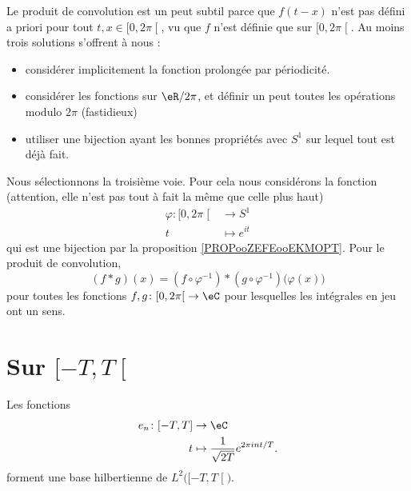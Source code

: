 Le produit de convolution est un peut subtil parce que \( f(t-x)\) n'est pas défini a priori pour tout \( t,x\in \mathopen[ 0 , 2\pi \mathclose[\), vu que \( f\) n'est définie que sur \( \mathopen[ 0 , 2\pi \mathclose[\). Au moins trois solutions s'offrent à nous :
\begin{itemize}
    \item 
       considérer implicitement la fonction prolongée par périodicité.
   \item
       considérer les fonctions sur \( \eR/2\pi\), et définir un peut toutes les opérations modulo \( 2\pi\) (fastidieux)
   \item
       utiliser une bijection ayant les bonnes propriétés avec \( S^1\) sur lequel tout est déjà fait.
\end{itemize}
Nous sélectionnons la troisième voie. Pour cela nous considérons la fonction (attention, elle n'est pas tout à fait la même que celle plus haut)
\begin{equation}
    \begin{aligned}
        \varphi\colon \mathopen[ 0 , 2\pi \mathclose[&\to S^1 \\
            t&\mapsto  e^{it} 
    \end{aligned}
\end{equation}
qui est une bijection par la proposition \ref{PROPooZEFEooEKMOPT}. Pour le produit de convolution,
\begin{equation}
    (f * g)(x)=(f\circ \varphi^{-1})*(g\circ\varphi^{-1})\big( \varphi(x) \big)
\end{equation}
pour toutes les fonctions \( f,g\colon \mathopen[ 0 , 2\pi \mathclose[\to \eC\) pour lesquelles les intégrales en jeu ont un sens.

\section{Sur \( \mathopen[ -T , T \mathclose[\)}

\begin{proposition}
    Les fonctions    
    \begin{equation}
        \begin{aligned}
            e_n\colon \mathopen[ -T , T \mathclose]&\to \eC \\
            t&\mapsto \frac{1}{ \sqrt{ 2T } } e^{2\pi int/T}. 
        \end{aligned}
    \end{equation}
    forment une base hilbertienne de \( L^2\big( \mathopen[ -T , T \mathclose[ \big)\).
\end{proposition}

